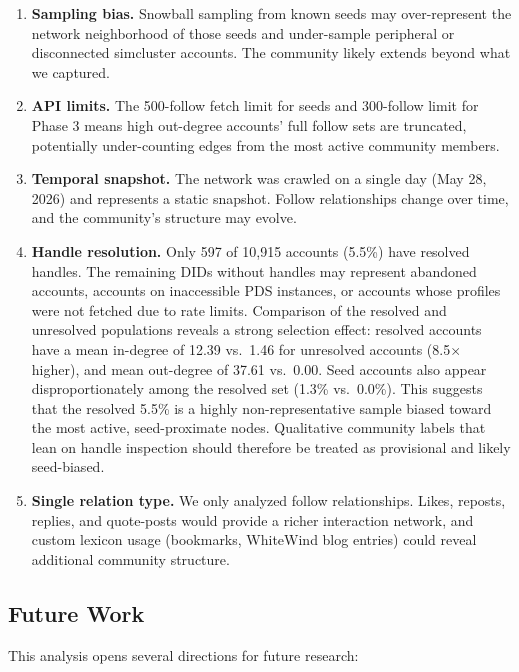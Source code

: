 \documentclass[11pt,a4paper]{article}
\begin{document}
\begin{enumerate}[leftmargin=*]
    \item \textbf{Sampling bias.} Snowball sampling from known seeds may over-represent the network neighborhood of those seeds and under-sample peripheral or disconnected simcluster accounts. The community likely extends beyond what we captured.
    \item \textbf{API limits.} The 500-follow fetch limit for seeds and 300-follow limit for Phase 3 means high out-degree accounts' full follow sets are truncated, potentially under-counting edges from the most active community members.
    \item \textbf{Temporal snapshot.} The network was crawled on a single day (May 28, 2026) and represents a static snapshot. Follow relationships change over time, and the community's structure may evolve.
    \item \textbf{Handle resolution.} Only 597 of 10,915 accounts (5.5\%) have resolved handles. The remaining DIDs without handles may represent abandoned accounts, accounts on inaccessible PDS instances, or accounts whose profiles were not fetched due to rate limits. Comparison of the resolved and unresolved populations reveals a strong selection effect: resolved accounts have a mean in-degree of 12.39 vs.\ 1.46 for unresolved accounts (8.5$\times$ higher), and mean out-degree of 37.61 vs.\ 0.00. Seed accounts also appear disproportionately among the resolved set (1.3\% vs.\ 0.0\%). This suggests that the resolved 5.5\% is a highly non-representative sample biased toward the most active, seed-proximate nodes. Qualitative community labels that lean on handle inspection should therefore be treated as provisional and likely seed-biased.
    \item \textbf{Single relation type.} We only analyzed follow relationships. Likes, reposts, replies, and quote-posts would provide a richer interaction network, and custom lexicon usage (bookmarks, WhiteWind blog entries) could reveal additional community structure.
\end{enumerate}

\subsection{Future Work}

This analysis opens several directions for future research:
\end{document}
